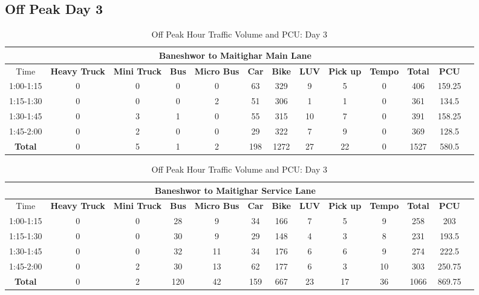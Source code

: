 \begin{landscape}
\centering
\section{Off Peak Day 3}
\begin{table}[h!]
\centering
\caption{Off Peak Hour Traffic Volume and PCU: Day 3}
\begin{tabular}{|c|c|c|c|c|c|c|c|c|c|c|c|c|}
    \hline
    \multicolumn{12}{|c|}{\textbf{Baneshwor to Maitighar Main Lane}} \\
    \hline
        Time & \textbf{Heavy Truck} & \textbf{Mini Truck} & \textbf{Bus} & \textbf{Micro Bus} & \textbf{Car} & \textbf{Bike} & \textbf{LUV} & \textbf{Pick up} & \textbf{Tempo} & \textbf{\textbf{Total}} & \textbf{PCU} \\
    \hline
1:00-1:15	&0	&0	&0	&0	&63	&329	&9	&5	&0	&406	&159.25 \\ \hline
1:15-1:30	&0	&0	&0	&2	&51	&306	&1	&1	&0	&361	&134.5 \\ \hline
1:30-1:45	&0	&3	&1	&0	&55	&315	&10	&7	&0	&391	&158.25 \\ \hline
1:45-2:00	&0	&2	&0	&0	&29	&322	&7	&9	&0	&369	&128.5 \\ \hline
\textbf{Total}	&0	&5	&1	&2	&198	&1272	&27	&22	&0	&1527	&580.5 \\ \hline

\end{tabular}

\vspace{0.5cm}
\begin{tabular}{|c|c|c|c|c|c|c|c|c|c|c|c|c|}
    \hline
    \multicolumn{12}{|c|}{\textbf{Baneshwor to Maitighar Service Lane}} \\
    \hline
        Time & \textbf{Heavy Truck} & \textbf{Mini Truck} & \textbf{Bus} & \textbf{Micro Bus} & \textbf{Car} & \textbf{Bike} & \textbf{LUV} & \textbf{Pick up} & \textbf{Tempo} & \textbf{\textbf{Total}} & \textbf{PCU} \\
    \hline
1:00-1:15	&0	&0	&28	&9	&34	&166	&7	&5	&9	&258	&203 \\ \hline
1:15-1:30	&0	&0	&30	&9	&29	&148	&4	&3	&8	&231	&193.5 \\ \hline
1:30-1:45	&0	&0	&32	&11	&34	&176	&6	&6	&9	&274	&222.5 \\ \hline
1:45-2:00	&0	&2	&30	&13	&62	&177	&6	&3	&10	&303	&250.75 \\ \hline
\textbf{Total}	&0	&2	&120	&42	&159	&667	&23	&17	&36	&1066	&869.75 \\ \hline

\end{tabular}

\end{table}
\end{landscape}

